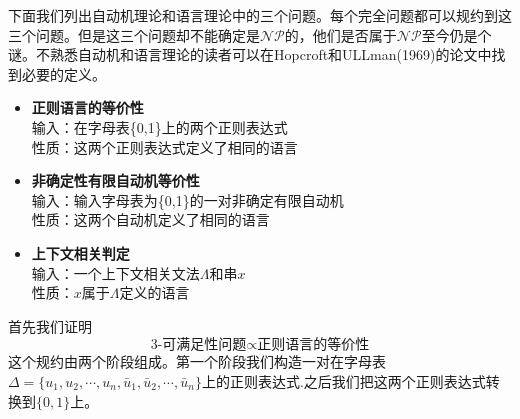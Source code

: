 \documentclass[twocolumn]{article}
\theoremstyle{nonumberplain}%
\begin{document}
    下面我们列出自动机理论和语言理论中的三个问题。每个完全问题都可以规约到这三个问题。但是这三个问题却不能确定是$\mathcal{NP}$的，他们是否属于$\mathcal{NP}$至今仍是个谜。不熟悉自动机和语言理论的读者可以在Hopcroft和ULLman(1969)的论文中找到必要的定义。
    \begin{itemize}
      \item {\bf 正则语言的等价性}\\
      输入：在字母表\{0,1\}上的两个正则表达式\\
      性质：这两个正则表达式定义了相同的语言

      \item {\bf 非确定性有限自动机等价性}\\
          输入：输入字母表为\{0,1\}的一对非确定有限自动机\\
          性质：这两个自动机定义了相同的语言

      \item {\bf 上下文相关判定}\\
      输入：一个上下文相关文法$\Lambda$和串$x$\\
      性质：$x$属于$\Lambda$定义的语言
    \end{itemize}

    首先我们证明$$\text{3-可满足性问题}\propto\text{正则语言的等价性}$$这个规约由两个阶段组成。第一个阶段我们构造一对在字母表$\Delta=\{u_1,u_2,\cdots,u_n,\bar{u}_1,\bar{u}_2,\cdots,\bar{u}_n\}$上的正则表达式.之后我们把这两个正则表达式转换到$\{0,1\}$上。
\end{document}
